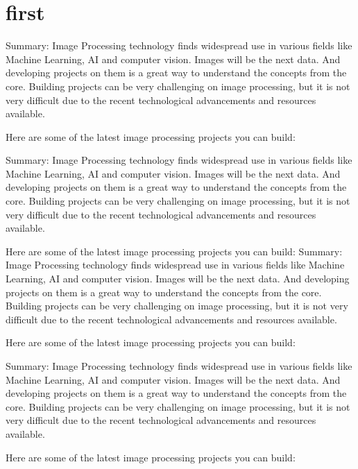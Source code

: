 \documentclass{article}
\begin{document}
	\section{first}
	Summary: Image Processing technology finds widespread use in various fields like Machine Learning, AI and computer vision. Images will be the next data. And developing projects on them is a great way to understand the concepts from the core. Building projects can be very challenging on image processing, but it is not very difficult due to the recent technological advancements and resources available.
	
	Here are some of the latest image processing projects you can build:
	
	Summary: Image Processing technology finds widespread use in various fields like Machine Learning, AI and computer vision. Images will be the next data. And developing projects on them is a great way to understand the concepts from the core. Building projects can be very challenging on image processing, but it is not very difficult due to the recent technological advancements and resources available.
	
	Here are some of the latest image processing projects you can build:
	Summary: Image Processing technology finds widespread use in various fields like Machine Learning, AI and computer vision. Images will be the next data. And developing projects on them is a great way to understand the concepts from the core. Building projects can be very challenging on image processing, but it is not very difficult due to the recent technological advancements and resources available.
	
	Here are some of the latest image processing projects you can build:
	
	Summary: Image Processing technology finds widespread use in various fields like Machine Learning, AI and computer vision. Images will be the next data. And developing projects on them is a great way to understand the concepts from the core. Building projects can be very challenging on image processing, but it is not very difficult due to the recent technological advancements and resources available.
	
	Here are some of the latest image processing projects you can build:
	
	\clearpage
	
\end{document}
